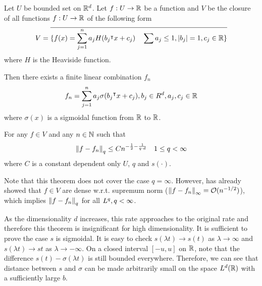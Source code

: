 \begin{theorem}
    \label{thm:improve_barron}
    Let $U$ be bounded set on $\mathbb{R}^d$. Let $f: U \to \mathbb{R}$ be a function and $V$ be
    the closure of all functions $f: U \to \mathbb{R}$ of the following form
    \begin{equation}
        V = \overline{
            \{f(x) = \sum_{j=1}^n a_j H(b_j{}^{\intercal} x + c_j) \quad 
            \sum a_j \leq 1, \left| b_j \right| = 1, c_j \in \mathbb{R} \}
            }
    \end{equation}
    where $H$ is the Heaviside function.

    Then there exists a finite linear combination $f_n$ 
    \begin{equation}
        f_n = \sum_{j=1}^n a_j \sigma(b_j{}^{\intercal} x + c_j), b_j \in R^d, a_j, c_j \in \mathbb{R}
    \end{equation}
    where $\sigma(x)$ is a sigmoidal function from $\mathbb{R}$ to $\mathbb{R}$.

    For any $f \in V$ and any $n \in \mathbb{N}$ such that 
    \begin{equation}
        \left\| f- f_n \right\|_{q} \leq C n^{-\frac{1}{2} - \frac{1}{q \cdot d}}
        \quad 1 \leq q < \infty
    \end{equation}
    where $C$ is a constant dependent only $U$, $q$ and $s(\cdot)$.
\end{theorem}


Note that this theorem does not cover the case $q = \infty$. However,
\cite{barronUniversalApproximationBounds1993} has already showed that $f\in V$ are
dense w.r.t. supremum norm ($\left\| f - f_n \right\|_{\infty} = \mathcal{O}(n^{-1/2})$), which
implies $\left\| f-f_n \right\|_{q}$ for all $L^{q}, q<\infty$.

As the dimensionality $d$ increases, this rate approaches to the original rate
and therefore this theorem is insignificant for high dimensionality. It is
sufficient to prove the case $s$ is sigmoidal. It is easy to check $s(\lambda t)
\to s(t)$ as $\lambda \to \infty$ and $s(\lambda t) \to s{t}$ as $\lambda \to
-\infty$. On a closed interval $[-u, u]$ on $\mathbb{R}$, note that the difference $s(t)
- \sigma(\lambda t)$ is still bounded everywhere. Therefore, we can see that
distance between $s$ and $\sigma$ can be made arbitrarily small on the space
$L^{d}(\mathbb{R})$ with a sufficiently large $b$.


